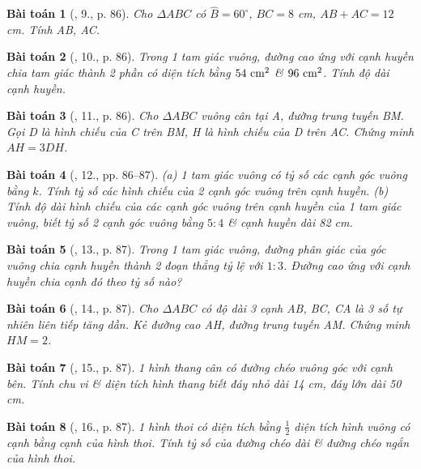 \documentclass{article}
\newtheorem{baitoan}{Bài toán}
\begin{document}
\begin{baitoan}[\cite{Binh_Toan_9_tap_1}, 9., p. 86]
	Cho $\Delta ABC$ có $\widehat{B} = 60^\circ$, $BC = 8$ {\rm cm}, $AB + AC = 12$ {\rm cm}. Tính AB, AC.
\end{baitoan}

\begin{baitoan}[\cite{Binh_Toan_9_tap_1}, 10., p. 86]
	Trong 1 tam giác vuông, đường cao ứng với cạnh huyền chia tam giác thành 2 phần có diện tích bằng $\rm54\ cm^2$ \& $\rm96\ cm^2$. Tính độ dài cạnh huyền.
\end{baitoan}

\begin{baitoan}[\cite{Binh_Toan_9_tap_1}, 11., p. 86]
	Cho $\Delta ABC$ vuông cân tại A, đường trung tuyến BM. Gọi D là hình chiếu của C trên BM, H là hình chiếu của D trên AC. Chứng minh $AH = 3DH$.
\end{baitoan}

\begin{baitoan}[\cite{Binh_Toan_9_tap_1}, 12., pp. 86--87]
	(a) 1 tam giác vuông có tỷ số các cạnh góc vuông bằng $k$. Tính tỷ số các hình chiếu của 2 cạnh góc vuông trên cạnh huyền. (b) Tính độ dài hình chiếu của các cạnh góc vuông trên cạnh huyền của 1 tam giác vuông, biết tỷ số 2 cạnh góc vuông bằng $5:4$ \& cạnh huyền dài {\rm82 cm}.
\end{baitoan}

\begin{baitoan}[\cite{Binh_Toan_9_tap_1}, 13., p. 87]
	Trong 1 tam giác vuông, đường phân giác của góc vuông chia cạnh huyền thành 2 đoạn thẳng tỷ lệ với $1:3$. Đường cao ứng với cạnh huyền chia cạnh đó theo tỷ số nào?
\end{baitoan}

\begin{baitoan}[\cite{Binh_Toan_9_tap_1}, 14., p. 87]
	Cho $\Delta ABC$ có độ dài 3 cạnh AB, BC, CA là 3 số tự nhiên liên tiếp tăng dần. Kẻ đường cao AH, đường trung tuyến AM. Chứng minh $HM = 2$.
\end{baitoan}

\begin{baitoan}[\cite{Binh_Toan_9_tap_1}, 15., p. 87]
	1 hình thang cân có đường chéo vuông góc với cạnh bên. Tính chu vi \& diện tích hình thang biết đáy nhỏ dài {\rm14 cm}, đáy lớn dài {\rm50 cm}.
\end{baitoan}

\begin{baitoan}[\cite{Binh_Toan_9_tap_1}, 16., p. 87]
	1 hình thoi có diện tích bằng $\frac{1}{2}$ diện tích hình vuông có cạnh bằng cạnh của hình thoi. Tính tỷ số của đường chéo dài \& đường chéo ngắn của hình thoi.
\end{baitoan}
\end{document}
